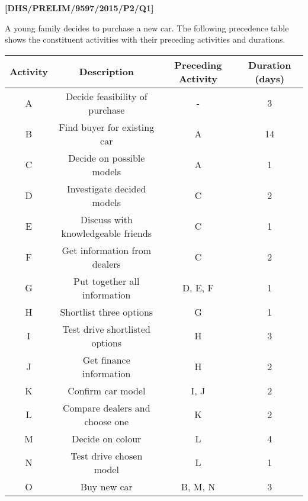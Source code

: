\item \textbf{{[}DHS/PRELIM/9597/2015/P2/Q1{]} }

A young family decides to purchase a new car. The following precedence
table shows the constituent activities with their preceding activities
and durations. 
\noindent \begin{center}
\begin{tabular}{|c|c|c|c|}
\hline 
Activity & Description & Preceding Activity & Duration (days) \tabularnewline
\hline 
A & Decide feasibility of purchase & - & 3\tabularnewline
\hline 
B & Find buyer for existing car & A & 14\tabularnewline
\hline 
C & Decide on possible models & A & 1\tabularnewline
\hline 
D & Investigate decided models & C & 2\tabularnewline
\hline 
E & Discuss with knowledgeable friends & C & 1\tabularnewline
\hline 
F & Get information from dealers & C & 2\tabularnewline
\hline 
G & Put together all information & D, E, F & 1\tabularnewline
\hline 
H & Shortlist three options & G & 1\tabularnewline
\hline 
I & Test drive shortlisted options & H & 3\tabularnewline
\hline 
J & Get finance information & H & 2\tabularnewline
\hline 
K & Confirm car model & I, J & 2\tabularnewline
\hline 
L & Compare dealers and choose one & K & 2\tabularnewline
\hline 
M & Decide on colour & L & 4\tabularnewline
\hline 
N & Test drive chosen model & L & 1\tabularnewline
\hline 
O & Buy new car & B, M, N & 3\tabularnewline
\hline 
\end{tabular}
\par\end{center}
